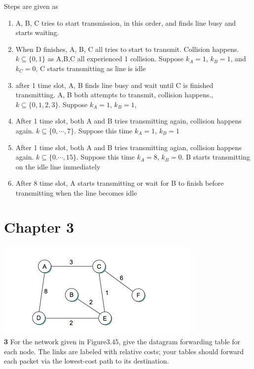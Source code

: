 \documentclass[11pt]{article}
\begin{document}
\begin{solution}
Steps are given as 
\begin{enumerate}
    \item A, B, C tries to start transmission, in this order, and finds line busy and starts waiting. 
    \item When D finishes, A, B, C all tries to start to transmit. Collision happens. $k \subseteq \{0,1\}$ as A,B,C all experienced 1 collision. Suppose $k_A=1$, $k_B=1$, and $k_C =0$, C starts transmitting as line is idle 
    \item after 1 time slot, A, B finds line busy and wait until C is finished transmitting. A, B both attempts to transmit, collision happens., $k\subseteq \{ 0,1,2,3\}$. Suppose $k_A=1$, $k_B=1$, 
    \item After 1 time slot, both A and B tries transmitting again, collision happens again. $k\subseteq \{0, \cdots, 7\}$. Suppose this time $k_A=1$, $k_B=1$
    \item After 1 time slot, both A and B tries transmitting agian, collision happens again. $k\subseteq \{0. \cdots, 15\}$. Suppose this time $k_A=8$, $k_B=0$. B starts transmitting on the idle line immediately
    \item After 8 time slot, A starts transmitting or wait for B to finish before transmitting when the line becomes idle 
\end{enumerate}
\end{solution}



\section*{Chapter 3}


\includegraphics{ch3_3}\\
\textbf{3} For the network given in Figure3.45, give the datagram forwarding table for each node. The links are labeled with relative costs; your tables should forward each packet via the lowest-cost path to its destination.
\end{document}
